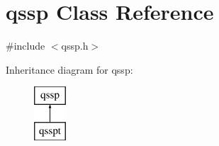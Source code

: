 \hypertarget{classqssp}{\section{qssp \-Class \-Reference}
\label{classqssp}
}


{\ttfamily \#include $<$qssp.\-h$>$}

\-Inheritance diagram for qssp\-:\begin{figure}[H]
\begin{center}
\leavevmode
\includegraphics[height=2.000000cm]{classqssp}
\end{center}
\end{figure}
